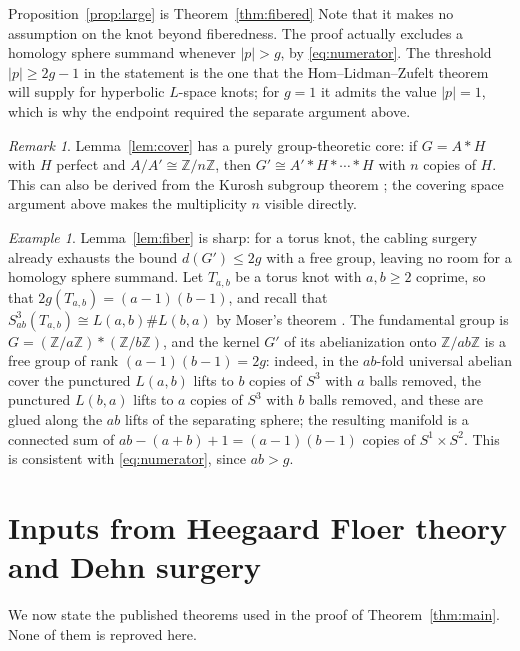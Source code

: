 \documentclass[11pt]{article}
\newcommand{\Z}{\mathbb Z}
\newcommand{\Surg}[2]{S^3_{#1}(#2)}
\newcommand{\rk}{d}
\theoremstyle{definition}
\theoremstyle{remark}
\newtheorem{remark}[theorem]{Remark}
\newtheorem{example}[theorem]{Example}
\begin{document}
Proposition~\ref{prop:large} is Theorem~\ref{thm:fibered}
Note that it
makes no assumption on the knot beyond fiberedness. The proof actually
excludes a homology sphere summand whenever \(|p|>g\), by
\eqref{eq:numerator}. The threshold \(|p|\geq 2g-1\) in the statement is
the one that the Hom--Lidman--Zufelt theorem will supply for hyperbolic
\(L\)-space knots; for \(g=1\) it admits the value \(|p|=1\), which is
why the endpoint required the separate argument above.

\begin{remark}\label{rem:algebraic}
Lemma~\ref{lem:cover} has a purely group-theoretic core: if \(G=A*H\)
with \(H\) perfect and \(A/A'\cong\Z/n\Z\), then
\(G'\cong A'*H*\cdots*H\) with \(n\) copies of \(H\). This can also be
derived from the Kurosh subgroup theorem \cite{Kurosh1934}; the covering
space argument above makes the multiplicity \(n\) visible directly.
\end{remark}

\begin{example}\label{ex:torus}
Lemma~\ref{lem:fiber} is sharp: for a torus knot, the cabling surgery
already exhausts the bound \(\rk(G')\leq2g\) with a free group, leaving
no room for a homology sphere summand. Let \(T_{a,b}\) be a torus knot
with \(a,b\geq2\) coprime, so that \(2g(T_{a,b})=(a-1)(b-1)\), and recall
that \(\Surg{ab}{T_{a,b}}\cong L(a,b)\#L(b,a)\) by Moser's theorem
\cite{Moser1971}. The fundamental group is \(G=(\Z/a\Z)*(\Z/b\Z)\), and
the kernel \(G'\) of its abelianization onto \(\Z/ab\Z\) is a free group
of rank \((a-1)(b-1)=2g\): indeed, in the \(ab\)-fold universal abelian
cover the punctured \(L(a,b)\) lifts to \(b\) copies of \(S^3\) with
\(a\) balls removed, the punctured \(L(b,a)\) lifts to \(a\) copies of
\(S^3\) with \(b\) balls removed, and these are glued along the \(ab\)
lifts of the separating sphere; the resulting manifold is a connected
sum of \(ab-(a+b)+1=(a-1)(b-1)\) copies of \(S^1\times S^2\). This is
consistent with \eqref{eq:numerator}, since \(ab>g\).
\end{example}

\section{Inputs from Heegaard Floer theory and Dehn surgery}\label{sec:inputs}

We now state the published theorems used in the proof of
Theorem~\ref{thm:main}. None of them is reproved here.
\end{document}
